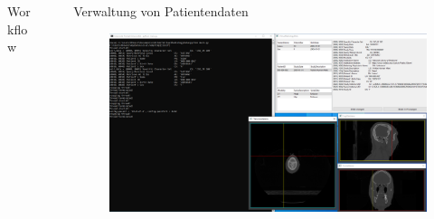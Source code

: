 \documentclass[final,hyperref={pdfpagelabels=false}]{beamer}
\begin{document}
\begin{frame}[t]
\begin{columns}[t]
\begin{column}{.465\textwidth}
\begin{block}{Workflow}
\begin{figure}
    \end{figure}
%
% 
    
\end{block}

\end{column}


\begin{column}{.025\textwidth}\end{column} %

\begin{column}{0.465\textwidth}

\begin{block}{Verwaltung von Patientendaten}

    \begin{figure}
        \centering
        
        \includegraphics[width=1.0\textwidth]{pythonApplication01}
                

\end{figure}
\end{block}
\end{column}
\end{columns}
\end{frame}
\end{document}
